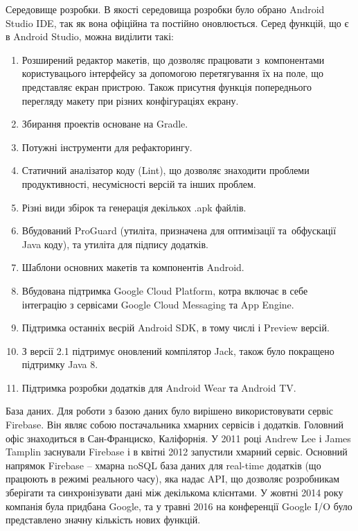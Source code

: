 \documentclass[../main.tex]{subfiles}
\begin{document}
Середовище розробки.
В якості середовища розробки було обрано Android Studio IDE, так як вона офіційна та постійно оновлюється. Серед функцій, що є в Android Studio, можна виділити такі:

\begin{enumerate}
	\item Розширений редактор макетів, що дозволяє працювати з~компонентами користувацього інтерфейсу за допомогою перетягування їх на поле, що представляє екран пристрою. Також присутня функція попереднього перегляду макету при різних конфігураціях екрану.
	\item Збирання проектів основане на Gradle.
	\item Потужні інструменти для рефакторингу.
	\item Статичний аналізатор коду (Lint), що дозволяє знаходити проблеми продуктивності, несумісності версій та інших проблем.
	\item Різні види збірок та генерація декількох .apk файлів.
	\item Вбудований ProGuard (утиліта, призначена для оптимізації та~обфускації Java коду), та утиліта для підпису додатків.
	\item Шаблони основних макетів та компонентів Android.
	\item Вбудована підтримка Google Cloud Platform, котра включає в себе інтеграцію з сервісами Google Cloud Messaging та App Engine.
	\item Підтримка останніх весрій Android SDK, в тому числі і Preview версій.
	\item З версії 2.1 підтримує оновлений компілятор Jack, також було покращено підтримку Java 8.
	\item Підтримка розробки додатків для Android Wear та Android TV.
\end{enumerate}

База даних.
Для роботи з базою даних було вирішено використовувати сервіс Firebase. Він являє собою постачальника хмарних сервісів і додатків. Головний офіс знаходиться в Сан-Франциско, Каліфорнія. У 2011 році Andrew Lee і James Tamplin заснували Firebase і в квітні 2012 запустили хмарний сервіс. Основний напрямок Firebase -- хмарна noSQL база даних для real-time додатків (що працюють в режимі реального часу), яка надає API, що дозволяє розробникам зберігати та синхронізувати дані між декількома клієнтами. У жовтні 2014 року компанія була придбана Google, та у травні 2016 на конференції Google I/O було представлено значну кількість нових функцій.
\end{document}
